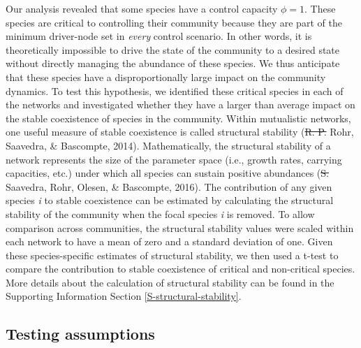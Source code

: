 \documentclass[a4paper]{artikel1}
\theoremstyle{definition}
\theoremstyle{definition}
\theoremstyle{definition}
\theoremstyle{remark}
\providecommand{\DIFdeltex}[1]{{\protect\color{red}\sout{#1}}}                      %
\providecommand{\DIFdelbegin}{} %
\providecommand{\DIFdelend}{} %
\providecommand{\DIFdel}[1]{\texorpdfstring{\DIFdeltex{#1}}{}} %
\begin{document}
Our analysis revealed that some species have a control capacity
\(\phi = 1\). These species are critical to controlling their community
because they are part of the minimum driver-node set in \emph{every}
control scenario. In other words, it is theoretically impossible to
drive the state of the community to a desired state without directly
managing the abundance of these species. We thus anticipate that these
species have a disproportionally large impact on the community dynamics.
To test this hypothesis, we identified these critical species in each of
the networks and investigated whether they have a larger than average
impact on the stable coexistence of species in the community. Within
mutualistic networks, one useful measure of stable coexistence is called
structural stability (\DIFdelbegin \DIFdel{R. P. }\DIFdelend Rohr, Saavedra, \& Bascompte, 2014).
Mathematically, the structural stability of a network represents the
size of the parameter space (i.e., growth rates, carrying capacities,
etc.) under which all species can sustain positive abundances (\DIFdelbegin \DIFdel{S.
}\DIFdelend Saavedra,
Rohr, Olesen, \& Bascompte, 2016). The contribution of any given species
\emph{i} to stable coexistence can be estimated by calculating the
structural stability of the community when the focal species \emph{i} is
removed. To allow comparison across communities, the structural
stability values were scaled within each network to have a mean of zero
and a standard deviation of one. Given these species-specific estimates
of structural stability, we then used a t-test to compare the
contribution to stable coexistence of critical and non-critical species.
More details about the calculation of structural stability can be found
in the Supporting Information Section \ref{S-structural-stability}.

\subsection{Testing assumptions}\label{testing-assumptions}
\end{document}
